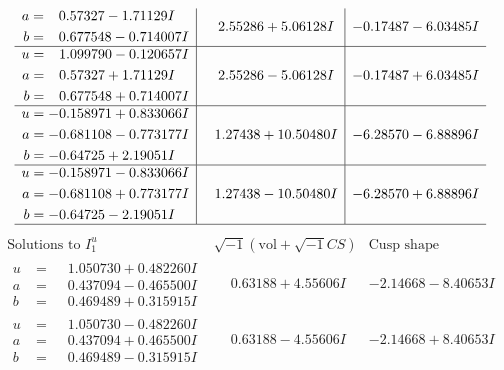 \documentclass[1p]{elsarticle_modified}
\theoremstyle{definition}
\newcommand{\I}{\sqrt{-1}}
\begin{document}
$$\begin{array}{c|c|c}
\begin{aligned}
a &= \phantom{-}0.57327 - 1.71129 I \\
b &= \phantom{-}0.677548 - 0.714007 I\end{aligned}
 & \phantom{-}2.55286 + 5.06128 I & -0.17487 - 6.03485 I \\ \hline\begin{aligned}
u &= \phantom{-}1.099790 - 0.120657 I \\
a &= \phantom{-}0.57327 + 1.71129 I \\
b &= \phantom{-}0.677548 + 0.714007 I\end{aligned}
 & \phantom{-}2.55286 - 5.06128 I & -0.17487 + 6.03485 I \\ \hline\begin{aligned}
u &= -0.158971 + 0.833066 I \\
a &= -0.681108 - 0.773177 I \\
b &= -0.64725 + 2.19051 I\end{aligned}
 & \phantom{-}1.27438 + 10.50480 I & -6.28570 - 6.88896 I \\ \hline\begin{aligned}
u &= -0.158971 - 0.833066 I \\
a &= -0.681108 + 0.773177 I \\
b &= -0.64725 - 2.19051 I\end{aligned}
 & \phantom{-}1.27438 - 10.50480 I & -6.28570 + 6.88896 I\\
 \hline 
 \end{array}$$\newpage$$\begin{array}{c|c|c}  
\text{Solutions to }I^u_{1}& \I (\text{vol} + \sqrt{-1}CS) & \text{Cusp shape}\\
 \hline 
\begin{aligned}
u &= \phantom{-}1.050730 + 0.482260 I \\
a &= \phantom{-}0.437094 - 0.465500 I \\
b &= \phantom{-}0.469489 + 0.315915 I\end{aligned}
 & \phantom{-}0.63188 + 4.55606 I & -2.14668 - 8.40653 I \\ \hline\begin{aligned}
u &= \phantom{-}1.050730 - 0.482260 I \\
a &= \phantom{-}0.437094 + 0.465500 I \\
b &= \phantom{-}0.469489 - 0.315915 I\end{aligned}
 & \phantom{-}0.63188 - 4.55606 I & -2.14668 + 8.40653 I \\ \hline\begin{aligned}

\end{aligned}
\end{array}$$
\end{document}
